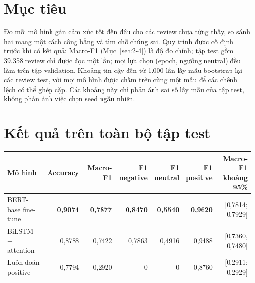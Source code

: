 \section{Mục tiêu}
\label{sec:7-1}

Đo mỗi mô hình gán cảm xúc tốt đến đâu cho các review chưa từng thấy, so sánh hai mạng một cách công bằng và tìm chỗ chúng sai. Quy trình được cố định trước khi có kết quả: Macro-F1 (Mục~\ref{sec:2-4}) là độ đo chính; tập test gồm 39.358 review chỉ được đọc một lần; mọi lựa chọn (epoch, ngưỡng neutral) đều làm trên tập validation. Khoảng tin cậy đến từ 1.000 lần lấy mẫu bootstrap lại các review test, với mọi mô hình được chấm trên cùng một mẫu để các chênh lệch có thể ghép cặp. Các khoảng này chỉ phản ánh sai số lấy mẫu của tập test, không phản ánh việc chọn seed ngẫu nhiên.

\section{Kết quả trên toàn bộ tập test}
\label{sec:7-2}

\begin{center}
\small
\begin{tabular}{@{}lrrrrrr@{}}
    \toprule
    Mô hình & Accuracy & Macro-F1 & \shortstack[r]{F1\\negative} & \shortstack[r]{F1\\neutral} & \shortstack[r]{F1\\positive} & \shortstack[r]{Macro-F1\\khoảng 95\%} \\
    \midrule
    BERT-base fine-tune & \textbf{0,9074} & \textbf{0,7877} & \textbf{0,8470} & \textbf{0,5540} & \textbf{0,9620} & [0,7814; 0,7929] \\
    BiLSTM + attention & 0,8788 & 0,7422 & 0,7863 & 0,4916 & 0,9488 & [0,7360; 0,7480] \\
    Luôn đoán positive & 0,7794 & 0,2920 & 0 & 0 & 0,8760 & [0,2911; 0,2929] \\
    \bottomrule
\end{tabular}
\end{center}

\begin{center}
\end{center}


